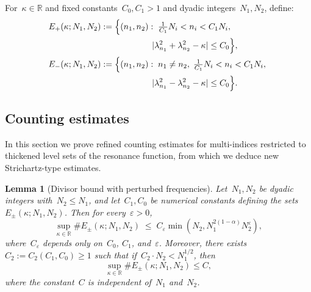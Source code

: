\documentclass[11pt,reqno,english]{amsart}
\numberwithin{equation}{section}
\theoremstyle{plain}
\newtheorem{lemma}[theorem]{Lemma}
\theoremstyle{definition}
\theoremstyle{remark}
\newcommand{\R}{\mathbb{R}}
\begin{document}
For~$\kappa\in\R$ and fixed constants~$C_0,C_1>1$ and dyadic integers~$N_1,N_2$, define:
\begin{align}\label{def:E+-}
	E_{+}(\kappa;N_1,N_2)&:=\Big\{(n_1,n_2):\; \tfrac{1}{C_1}N_i<n_i<C_1 N_i,\;\notag\\
	&\qquad\qquad\qquad |\lambda_{n_1}^2+ \lambda_{n_2}^2-\kappa|\leq C_0\Big\},\notag \\
	E_-(\kappa;N_1,N_2)&:=\Big\{(n_1,n_2):\; n_1\neq n_2,\; \tfrac{1}{C_1}N_i<n_i< C_1N_i,\;\notag\\
	&\qquad\qquad\qquad |\lambda_{n_1}^2-\lambda_{n_2}^2-\kappa|\leq C_0 \Big\}.
\end{align}

\subsection{Counting estimates}
In this section we prove refined counting estimates for multi-indices restricted to thickened level sets of the resonance function, from which we deduce new Strichartz-type estimates.

\begin{lemma}[Divisor bound with perturbed frequencies]
	\label{lem:db}
	Let~$N_{1}, N_{2}$ be dyadic integers with~$N_{2} \le N_{1}$, and let~$C_1, C_0$ be numerical constants defining the sets~$E_{\pm}(\kappa;N_1,N_2)$. Then for every~$\varepsilon>0$,
	\[
	\sup_{\kappa\in\R}\# E_{\pm}(\kappa;N_1,N_2)
	\;\leq\; C_{\varepsilon}\min(N_2, N_1^{2(1-\alpha)}N_2^{\varepsilon}),
	\]
	where~$C_{\varepsilon}$ depends only on~$C_0$, $C_1$, and~$\varepsilon$.
	Moreover, there exists~$C_2:=C_2(C_1,C_0)\geq 1$ such that if~$C_2\cdot N_2 < N_1^{1/2}$, then
	\[
	\sup_{\kappa\in\R} \# E_{\pm}(\kappa;N_1,N_2)\leq C,
	\]
	where the constant~$C$ is independent of~$N_1$ and~$N_2$.
\end{lemma}
\end{document}
